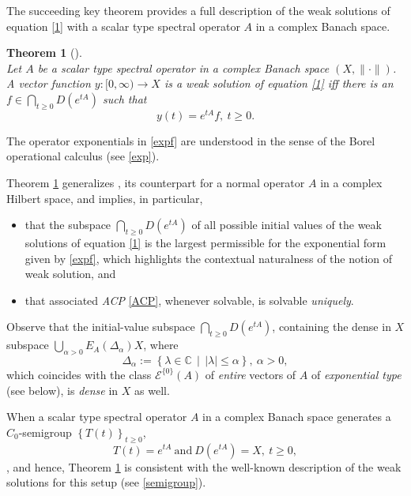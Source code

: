 \documentclass{amsart}
\theoremstyle{plain}
\newtheorem{thm}{Theorem}[section]
\theoremstyle{definition}
\begin{document}
The succeeding key theorem provides a full description of the weak solutions of equation \eqref{1} with a scalar type spectral operator $A$ in a complex Banach space.

\begin{thm}[{\cite[Theorem $4.2$]{Markin2002(1)}}]\label{GWS}\ \\
Let $A$ be a scalar type spectral operator in a complex Banach space $(X,\|\cdot\|)$. A vector function $y:[0,\infty) \to X$ is a weak solution 
of equation \eqref{1} iff there is an $\displaystyle f \in \bigcap_{t\ge 0}D(e^{tA})$ such that
\begin{equation}\label{expf}
y(t)=e^{tA}f,\ t\ge 0.
\end{equation}
\end{thm}

The operator exponentials in \eqref{expf} are understood in the sense of the Borel operational calculus (see \eqref{exp}).

Theorem \ref{GWS} generalizes {\cite[Theorem $3.1$]{Markin1999}}, its counterpart for a normal operator $A$ in a complex Hilbert space, and implies, in particular,
\begin{itemize}
\item that the subspace $\bigcap_{t\ge 0}D(e^{tA})$ of all possible initial values of the weak solutions of equation \eqref{1} is the largest permissible for the exponential form given by \eqref{expf}, which highlights the contextual naturalness of the notion of weak solution, and
\item that associated \textit{ACP} \eqref{ACP}, whenever solvable,  is solvable \textit{uniquely}.
\end{itemize}

Observe that the initial-value subspace $\bigcap_{t\ge 0}D(e^{tA})$, containing the dense in $X$ subspace $\bigcup_{\alpha>0}E_A(\Delta_\alpha)X$, where
\begin{equation*}
\Delta_\alpha:=\left\{\lambda\in{{\mathbb C}}\,\middle|\,|\lambda|\le \alpha \right\},\ \alpha>0,
\end{equation*}
which coincides with the class ${\mathscr E}^{\{0\}}(A)$ of \textit{entire} vectors of $A$ of \textit{exponential type} (see below), is \textit{dense} in $X$ as well.

When a scalar type spectral operator $A$ in a complex Banach space generates a $C_0$-semigroup $\left\{T(t) \right\}_{t\ge 0}$, 
\[
T(t)=e^{tA}\ \text{and}\ D(e^{tA})=X,\ t\ge 0,
\]
\cite{Markin2002(2)}, and hence, Theorem \ref{GWS} is consistent with the well-known description of the weak solutions for this setup (see \eqref{semigroup}).
\end{document}
